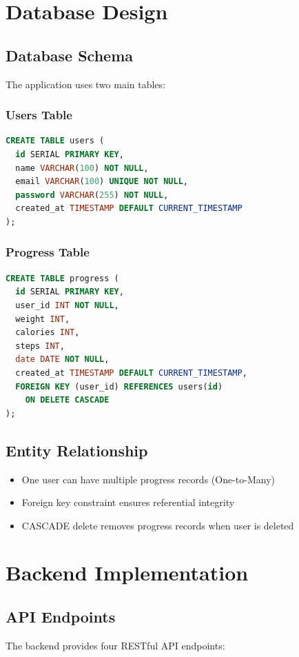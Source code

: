 \documentclass[12pt,a4paper]{article}
\begin{document}
\section{Database Design}

\subsection{Database Schema}
The application uses two main tables:

\subsubsection{Users Table}
\begin{lstlisting}[language=SQL]
CREATE TABLE users (
  id SERIAL PRIMARY KEY,
  name VARCHAR(100) NOT NULL,
  email VARCHAR(100) UNIQUE NOT NULL,
  password VARCHAR(255) NOT NULL,
  created_at TIMESTAMP DEFAULT CURRENT_TIMESTAMP
);
\end{lstlisting}

\subsubsection{Progress Table}
\begin{lstlisting}[language=SQL]
CREATE TABLE progress (
  id SERIAL PRIMARY KEY,
  user_id INT NOT NULL,
  weight INT,
  calories INT,
  steps INT,
  date DATE NOT NULL,
  created_at TIMESTAMP DEFAULT CURRENT_TIMESTAMP,
  FOREIGN KEY (user_id) REFERENCES users(id) 
    ON DELETE CASCADE
);
\end{lstlisting}

\subsection{Entity Relationship}
\begin{itemize}
    \item One user can have multiple progress records (One-to-Many)
    \item Foreign key constraint ensures referential integrity
    \item CASCADE delete removes progress records when user is deleted
\end{itemize}

\section{Backend Implementation}

\subsection{API Endpoints}
The backend provides four RESTful API endpoints:
\end{document}
